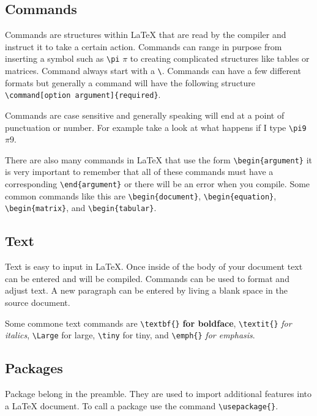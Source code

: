\documentclass{article} 	%
\numberwithin{equation}{section}
\begin{document}
		\subsection{Commands}
		Commands are structures within \LaTeX{} that are read by the compiler and instruct it to take a certain action.  Commands can range in purpose from inserting a symbol such as \verb|\pi| $\pi$ to creating complicated structures like tables or matrices.  Command always start with a \verb|\|.  Commands can have a few different formats but generally a command will have the following structure \verb|\command[option argument]{required}|.

		Commands are case sensitive and generally speaking will end at a point of punctuation or number.  For example take a look at what happens if I type \verb|\pi9| $\pi9$.

		There are also many commands in \LaTeX{} that use the form \verb|\begin{argument}| it is very important to remember that all of these commands must have a corresponding \verb|\end{argument}| or there will be an error when you compile.  Some common commands like this are \verb|\begin{document}|, \verb|\begin{equation}|, \verb|\begin{matrix}|, and \verb|\begin{tabular}|.

		\subsection{Text}
		Text is easy to input in \LaTeX{}.  Once inside of the body of your document text can be entered and will be compiled.  Commands can be used to format and adjust text.  A new paragraph can be entered by living a blank space in the source document.

		Some commone text commands are \verb|\textbf{}| \textbf{for boldface}, \verb|\textit{}| \textit{for italics}, \verb|\Large| \Large for large\normalsize, \verb|\tiny| \tiny for tiny\normalsize, and \verb|\emph{}| \emph{for emphasis}.

		\subsection{Packages}
		Package belong in the preamble.  They are used to import additional features into a \LaTeX{} document.  To call a package use the command \verb|\usepackage{}|.
\end{document}
